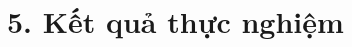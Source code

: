 \documentclass[../main.tex]{subfiles}
\begin{document}
\section{5. Kết quả thực nghiệm}

\end{document}
